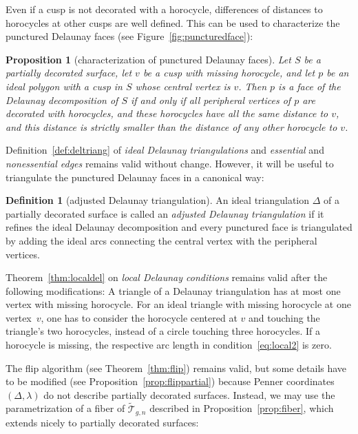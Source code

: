 \documentclass[a4paper, 11pt]{article}
\newcommand{\Teich}{\mathcal{T}}
\newcommand{\decTeich}{\widetilde{\Teich}}
\theoremstyle{plain}
\newtheorem{proposition}[theorem]{Proposition}
\theoremstyle{definition}
\newtheorem{definition}[theorem]{Definition}
\begin{document}
Even if a cusp is not decorated with a horocycle, differences of
distances to horocycles at other cusps are well defined. This can be
used to characterize the punctured Delaunay
faces (see Figure~\ref{fig:puncturedface}): 

\begin{proposition}[characterization of punctured Delaunay faces]
  \label{prop:punctured}
  Let $S$ be a partially decorated surface, let $v$ be a cusp with
  missing horocycle, and let $p$ be an ideal polygon with a cusp in
  $S$ whose central vertex is $v$. Then $p$ is a face of the Delaunay
  decomposition of $S$ if and only if all peripheral vertices of $p$
  are decorated with horocycles, and these horocycles have all the
  same distance to $v$, and this distance is strictly smaller than the
  distance of any other horocycle to $v$.
\end{proposition}

Definition~\ref{def:deltriang} of \emph{ideal Delaunay triangulations}
and \emph{essential} and \emph{nonessential edges} remains valid
without change. However, it will be useful to triangulate
the punctured Delaunay faces in a canonical way:

\begin{definition}[adjusted Delaunay triangulation]
  \label{def:adjusted}
  An ideal triangulation $\Delta$ of a partially decorated surface is
  called an \emph{adjusted Delaunay triangulation} if it refines the
  ideal Delaunay decomposition and every punctured face is
  triangulated by adding the ideal arcs connecting the central vertex
  with the peripheral vertices.
\end{definition}

Theorem~\ref{thm:localdel} on
\emph{local Delaunay conditions} remains valid after the following
modifications: A triangle of a Delaunay triangulation has at most one
vertex with missing horocycle. For an ideal triangle with missing
horocycle at one vertex~$v$, one has to consider the horocycle
centered at $v$ and touching the triangle's two horocycles, instead of
a circle touching three horocycles. If a horocycle is missing, the
respective arc length in condition~\eqref{eq:local2} is zero.

The flip algorithm (see Theorem~\ref{thm:flip}) remains valid, but
some details have to be modified (see
Proposition~\ref{prop:flippartial}) because Penner coordinates
$(\Delta,\lambda)$ do not describe partially decorated
surfaces. Instead, we may use the parametrization of a fiber of
$\decTeich_{g,n}$ described in Proposition~\ref{prop:fiber}, which
extends nicely to partially decorated surfaces:
\end{document}

